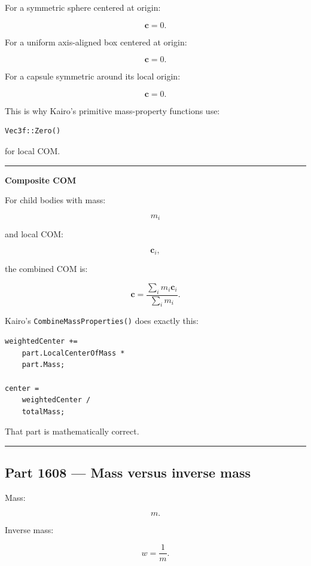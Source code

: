 For a symmetric sphere centered at origin:

\[
\mathbf{c}=0.
\]

For a uniform axis-aligned box centered at origin:

\[
\mathbf{c}=0.
\]

For a capsule symmetric around its local origin:

\[
\mathbf{c}=0.
\]

This is why Kairo's primitive mass-property functions use:

\begin{verbatim}
Vec3f::Zero()
\end{verbatim}

for local COM.

\begin{center}\rule{0.5\linewidth}{0.5pt}\end{center}

\textbf{Composite COM}

For child bodies with mass:

\[
m_i
\]

and local COM:

\[
\mathbf{c}_i,
\]

the combined COM is:

\[
\boxed{
\mathbf{c}
=
\frac{
\sum_i m_i\mathbf{c}_i
}{
\sum_i m_i
}.
}
\]

Kairo's \texttt{CombineMassProperties()} does exactly this:

\begin{verbatim}
weightedCenter +=
    part.LocalCenterOfMass *
    part.Mass;

center =
    weightedCenter /
    totalMass;
\end{verbatim}

That part is mathematically correct.

\begin{center}\rule{0.5\linewidth}{0.5pt}\end{center}

\subsection{Part 1608 --- Mass versus inverse mass}\label{06-engine-ii-ch034-part-1608-mass-versus-inverse-mass}

Mass:

\[
m.
\]

Inverse mass:

\[
w=
\frac{1}{m}.
\]

